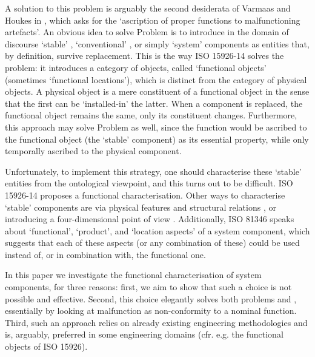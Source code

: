 \documentclass[
]{ceurart}
\begin{document}
\eflist 
A solution to this problem is arguably the second desiderata of Varmaas and Houkes in \cite{vermaasAscribingFunctionsTechnical2003}, which asks for the `ascription of proper functions to malfunctioning artefacts'.
An obvious idea to solve Problem  is to introduce in the domain of discourse `stable' \cite{compagnoComparingOntologicalAlternatives2021}, `conventional' \cite{guarinoArtefactualSystemsMissing2014}, or simply `system' \cite{westDevelopingHighQuality2011} components as entities that, by definition, survive replacement.   
This is the way ISO 15926-14 \cite{kluwerISO159261420202020} solves the problem: it introduces a category of objects, called `functional objects' (sometimes `functional locations'), which is distinct from the category of physical objects. A physical object is a mere constituent of a functional object in the sense that the first can be `installed-in' the latter. When a component is replaced, the functional object remains the same, only its constituent changes. Furthermore, this approach may solve Problem  as well, since the function would be ascribed to the functional object (the `stable' component) as its essential property, while only temporally ascribed to the physical component. 

Unfortunately, to implement this strategy, one should characterise these `stable' entities from the ontological viewpoint, and this turns out to be difficult.
ISO 15926-14 proposes a functional characterisation. Other ways to characterise `stable' components are via physical features and structural relations \cite{compagnoComparingOntologicalAlternatives2021}, or introducing a four-dimensional point of view \cite{westDevelopingHighQuality2011}. Additionally, ISO 81346 \cite{ISOIEC8134612009} speaks about `functional', `product', and `location aspects' of a system component, which suggests that each of these aspects (or any combination of these) could be used instead of, or in combination with, the functional one.

In this paper we investigate the functional characterisation of system components, for three reasons: first, we aim to show that such a choice is not possible and effective. Second, this choice elegantly solves both problems  and , essentially by looking at malfunction as non-conformity to a nominal function. Third, such an approach relies on already existing engineering methodologies and is, arguably, preferred in some engineering domains (cfr. e.g. the functional objects of ISO 15926).
\end{document}
